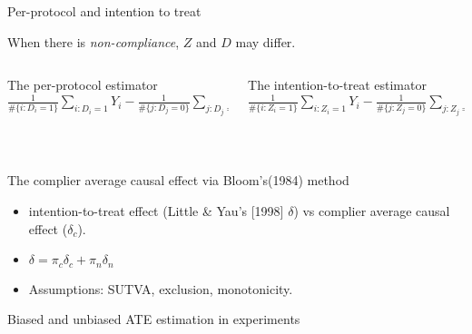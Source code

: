 \begin{frame}{Per-protocol and intention to treat}

When there is \textit{non-compliance}, $Z$ and $D$ may differ.  \pause  

  \begin{columns}
    \begin{Column}
  { The per-protocol estimator} \\      
$\frac{1}{\# \{i: D_i = 1\}} \sum_{i:D_i=1} Y_i - \frac{1}{\# \{j: D_j = 0\}} \sum_{j:D_j=0} Y_j$
\bigskip

\vspace{.5\textheight} 
\mbox{ }

    \end{Column}
    \begin{Column}
  { The intention-to-treat estimator} \\      
$\frac{1}{\# \{i: Z_i = 1\}} \sum_{i:Z_i=1} Y_i - \frac{1}{\# \{j: Z_j = 0\}} \sum_{j:Z_j=0} Y_j$
\bigskip


\vspace{.5\textheight} 
\mbox{ }
    \end{Column}

  \end{columns}
\end{frame}

\begin{frame}{The complier average causal effect via Bloom's(1984) method}
  \begin{itemize}
  \item intention-to-treat effect (Little \& Yau's [1998] $\delta$) vs
    complier average causal effect ($\delta_{c}$).
  \item $\delta = \pi_{c} \delta_{c} + \pi_{n} \delta_{n} $
  \item Assumptions: SUTVA, exclusion, monotonicity.
 \end{itemize}

\end{frame}

\begin{frame}{Biased and unbiased ATE estimation in experiments}
  
\end{frame}

